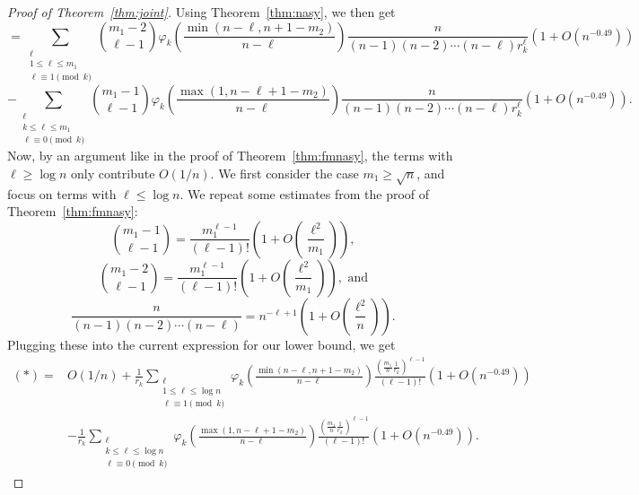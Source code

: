 \documentclass{amsart}
\theoremstyle{definition}
\begin{document}
\begin{proof}[Proof of Theorem~\ref{thm:joint}]
Using Theorem~\ref{thm:nasy}, we then get
\[=\sum_{\substack{\ell\\1\leq \ell \leq m_1\\ \ell\equiv 1 \pmod{k}}}\binom{m_1-2}{\ell-1}\varphi_k\left(\frac{\min(n-\ell,n+1-m_2)}{n-\ell}\right)\frac{n}{(n-1)(n-2)\cdots (n-\ell)r_k^{\ell}}\left(1+O\left(n^{-0.49}\right)\right)\]\[ - \sum_{\substack{\ell\\k\leq \ell \leq m_1\\ \ell\equiv 0 \pmod{k}}}   \binom{m_1-1}{\ell-1}\varphi_k\left(\frac{\max(1,n-\ell+1-m_2)}{n-\ell}\right)\frac{n}{(n-1)(n-2)\cdots (n-\ell)r_k^{\ell}}\left(1+O\left(n^{-0.49}\right)\right).\]
Now, by an argument like in the proof of Theorem~\ref{thm:fmnasy}, the terms with $\ell\geq \log n$ only contribute $O(1/n)$. We first consider the case $m_1\geq \sqrt{n}$, and focus on terms with $\ell\leq \log n$. We repeat some estimates from the proof of Theorem~\ref{thm:fmnasy}:
\[\binom{m_1-1}{\ell-1}=\frac{m_1^{\ell-1}}{(\ell-1)!}\left(1+O\left(\frac{\ell^2}{m_1}\right)\right),\]
\[\binom{m_1-2}{\ell-1}=\frac{m_1^{\ell-1}}{(\ell-1)!}\left(1+O\left(\frac{\ell^2}{m_1}\right)\right),\text{ and}\]
\[\frac{n}{(n-1)(n-2)\cdots(n-\ell)}=n^{-\ell+1}\left(1+O\left(\frac{\ell^2}{n}\right)\right).\]
Plugging these into the current expression for our lower bound, we get
\begin{align*}
    (*)=&O(1/n)+\frac{1}{r_k}\sum_{\substack{\ell\\1\leq \ell \leq \log n\\ \ell\equiv 1 \pmod{k}}}\varphi_k\left(\frac{\min(n-\ell,n+1-m_2)}{n-\ell}\right)\frac{\left(\frac{m_1}{n}\frac{1}{r_k}\right)^{\ell-1}}{(\ell-1)!}\left(1+O\left(n^{-0.49}\right)\right)\\ &- \frac{1}{r_k}\sum_{\substack{\ell\\k\leq \ell \leq \log n\\ \ell\equiv 0 \pmod{k}}}  \varphi_k\left(\frac{\max(1,n-\ell+1-m_2)}{n-\ell}\right)\frac{\left(\frac{m_1}{n}\frac{1}{r_k}\right)^{\ell-1}}{(\ell-1)!}\left(1+O\left(n^{-0.49}\right)\right).
\end{align*}



\end{proof}
\end{document}
